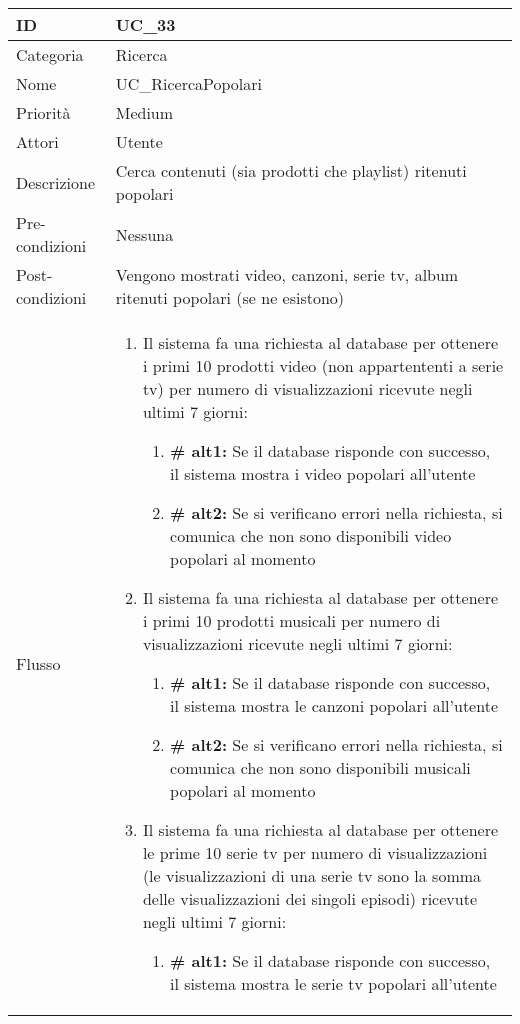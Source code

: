 \begin{center}
\begin{tabular}{ |p{2cm}|p{13cm}|  }
\hline
ID & UC\_33 \\\hline
Categoria & Ricerca \\\hline
Nome & UC\_RicercaPopolari\\\hline
Priorità & Medium \\\hline
Attori &  Utente \\\hline
Descrizione & Cerca contenuti (sia prodotti che playlist) ritenuti popolari\\\hline
Pre-condizioni & Nessuna\\\hline
Post-condizioni &  Vengono mostrati video, canzoni, serie tv, album ritenuti popolari (se ne esistono)\\\hline
Flusso &  	\begin{enumerate}
		\item Il sistema fa una richiesta al database per ottenere i primi 10 prodotti video (non appartententi a serie tv) per numero di visualizzazioni ricevute negli ultimi 7 giorni:
				\begin{enumerate}[label*=\arabic*.]
					\item \textbf{\# alt1:} Se il database risponde con successo, il sistema mostra i video popolari all'utente
					\item \textbf{\# alt2:} Se si verificano errori nella richiesta, si comunica che non sono disponibili video popolari al momento
				\end{enumerate}
		\item Il sistema fa una richiesta al database per ottenere i primi 10 prodotti musicali per numero di visualizzazioni ricevute negli ultimi 7 giorni:
				\begin{enumerate}[label*=\arabic*.]
					\item \textbf{\# alt1:} Se il database risponde con successo, il sistema mostra le canzoni popolari all'utente
					\item \textbf{\# alt2:} Se si verificano errori nella richiesta, si comunica che non sono disponibili musicali popolari al momento
				\end{enumerate}
		\item Il sistema fa una richiesta al database per ottenere le prime 10 serie tv per numero di visualizzazioni (le visualizzazioni di una serie tv sono la somma delle visualizzazioni dei singoli episodi) ricevute negli ultimi 7 giorni:
				\begin{enumerate}[label*=\arabic*.]
					\item \textbf{\# alt1:} Se il database risponde con successo, il sistema mostra le serie tv popolari all'utente

\end{enumerate}
\end{enumerate}
\end{tabular}
\end{center}
